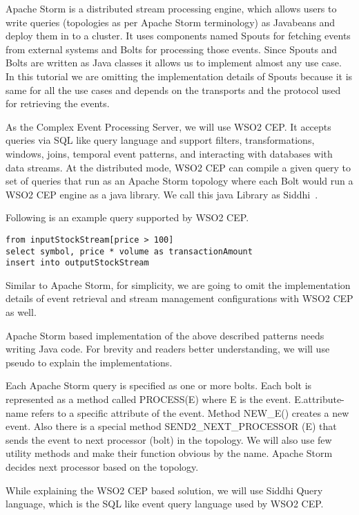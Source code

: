 \documentclass{sig-alternate}
\begin{document}
{Apache Storm is a distributed stream processing engine, which allows users to write queries (topologies as per Apache Storm terminology) as Javabeans and deploy them in to a cluster. It uses components named Spouts for fetching events from external systems and Bolts for processing those events. Since Spouts and Bolts are written as Java classes it allows us to implement almost any use case. In this tutorial we are omitting the implementation details of Spouts because it is same for all the use cases and depends on the transports and the protocol used for retrieving the events. 

As the Complex Event Processing Server, we will use WSO2 CEP. It accepts queries via SQL like query language and support filters, transformations, windows, joins, temporal event patterns, and interacting with databases with data streams. At the distributed mode, WSO2 CEP can compile a given query to set of queries that run as an Apache Storm topology where each Bolt would run a WSO2 CEP engine as a java library. We call this java Library as Siddhi~\cite{siddhilib}.

Following is an example query supported by WSO2 CEP. 

\lstset{language=siddhi}
\begin{lstlisting}[mathescape]
from inputStockStream[price > 100]
select symbol, price * volume as transactionAmount
insert into outputStockStream
\end{lstlisting}


Similar to Apache Storm, for simplicity, we are going to omit the implementation details of event retrieval and stream management configurations with WSO2 CEP as well. 

Apache Storm based implementation of the above described patterns needs writing Java code. For brevity and readers better understanding, we will use pseudo to explain the implementations. 

Each Apache Storm query is specified as one or more bolts. Each bolt is represented as a method called PROCESS(E) where E is the event. E.attribute-name refers to a specific attribute of the event. Method NEW\_E() creates a new event. Also there is a special method SEND2\_NEXT\_PROCESSOR (E) that sends the event to next processor (bolt) in the topology.  We will also use few utility methods and make their function obvious by the name. Apache Storm decides next processor based on the topology. 

While explaining the WSO2 CEP based solution, we will use Siddhi Query language, which is the SQL like event query language used by WSO2 CEP. 


}
\end{document}
